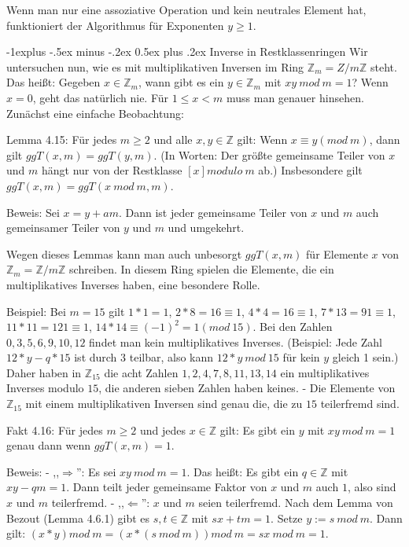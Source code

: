 \documentclass[a4paper]{article}
\makeatletter
\renewcommand{\subsection}{\@startsection{subsection}{2}{0mm}%
 {-1explus -.5ex minus -.2ex}%
 {0.5ex plus .2ex}%
 {\normalfont\normalsize\bfseries}}
\makeatother
\begin{document}
\begin{multicols}{3}
    Wenn man nur eine assoziative Operation und kein neutrales Element hat, funktioniert der Algorithmus für Exponenten $y\geq 1$.

    \subsection{Inverse in Restklassenringen}
    Wir untersuchen nun, wie es mit multiplikativen Inversen im Ring $\mathbb{Z}_m =Z/m\mathbb{Z}$ steht. Das heißt: Gegeben $x\in\mathbb{Z}_m$, wann gibt es ein $y\in\mathbb{Z}_m$ mit $xy\ mod\ m= 1$? Wenn $x=0$, geht das natürlich nie. Für $1\leq x<m$ muss man genauer hinsehen.
    Zunächst eine einfache Beobachtung:

    Lemma 4.15: Für jedes $m\geq 2$ und alle $x,y\in\mathbb{Z}$ gilt: Wenn $x\equiv y(mod\ m)$, dann gilt $ggT(x,m)=ggT(y,m)$. (In Worten: Der größte gemeinsame Teiler von $x$ und $m$ hängt nur von der Restklasse $[x] modulo\ m$ ab.) Insbesondere gilt $ggT(x,m) = ggT(x\ mod\ m,m)$.

    Beweis: Sei $x=y+am$. Dann ist jeder gemeinsame Teiler von $x$ und $m$ auch gemeinsamer Teiler von $y$ und $m$ und umgekehrt.

    Wegen dieses Lemmas kann man auch unbesorgt $ggT(x,m)$ für Elemente $x$ von $\mathbb{Z}_m =\mathbb{Z}/m\mathbb{Z}$ schreiben. In diesem Ring spielen die Elemente, die ein multiplikatives Inverses haben, eine besondere Rolle.

    Beispiel: Bei $m=15$ gilt $1*1=1$, $2*8 = 16\equiv 1$, $4*4 = 16\equiv 1$, $7*13 = 91\equiv 1$, $11*11 = 121\equiv 1$, $14* 14 \equiv (-1)^2 = 1 (mod\ 15)$. Bei den Zahlen $0, 3 , 5 , 6 , 9 , 10 , 12$ findet man kein multiplikatives Inverses. (Beispiel: Jede Zahl $12*y-q*15$ ist durch $3$ teilbar, also kann $12*y\ mod\ 15$ für kein $y$ gleich 1 sein.) Daher haben in $\mathbb{Z}_{15}$ die acht Zahlen $1, 2, 4, 7, 8, 11, 13, 14$ ein multiplikatives Inverses modulo $15$, die anderen sieben Zahlen haben keines. - Die Elemente von $\mathbb{Z}_{15}$ mit einem multiplikativen Inversen sind genau die, die zu $15$ teilerfremd sind.

    Fakt 4.16: Für jedes $m\geq 2$ und jedes $x\in\mathbb{Z}$ gilt: Es gibt ein $y$ mit $xy\ mod\ m=1$ genau dann wenn $ggT(x,m)=1$.

    Beweis:
    - ,,$\Rightarrow$'': Es sei $xy\ mod\ m= 1$. Das heißt: Es gibt ein $q\in\mathbb{Z}$ mit $xy-qm=1$. Dann teilt jeder gemeinsame Faktor von $x$ und $m$ auch $1$, also sind $x$ und $m$ teilerfremd.
    - ,,$\Leftarrow$'': $x$ und $m$ seien teilerfremd. Nach dem Lemma von Bezout (Lemma 4.6.1) gibt es $s,t\in\mathbb{Z}$ mit $sx+tm=1$. Setze $y:=s\ mod\ m$. Dann gilt: $(x*y) mod\ m= (x*(s\ mod\ m)) mod\ m=sx\ mod\ m= 1$.


\end{multicols}
\end{document}
